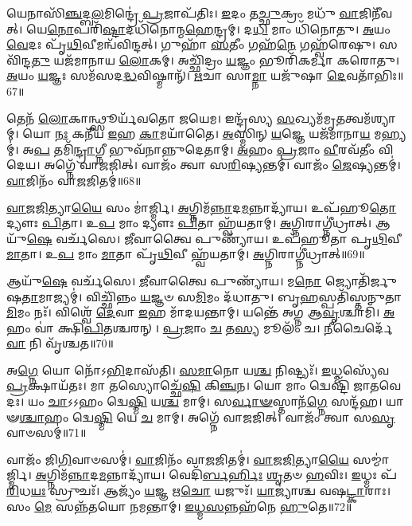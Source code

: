 𑌯𑍇𑌨𑌾𑌸𑌿᳴\-\ul{𑌞𑍍𑌚}\-𑌦𑍍𑌬\-\ul{𑌲}\-𑌮𑌿𑌨𑍍𑌦𑍍𑌰𑍇॑ \ul{𑌪𑍍𑌰}\-𑌜𑌾\-𑌪᳴𑌤𑌿𑌃।
\-\ul{𑌇}\-𑌦𑌂 𑌤\-\ul{𑌚𑍍𑌛𑍁}\-𑌕𑍍𑌰𑌂 𑌮𑌧𑍁᳴ \ul{𑌵𑌾}\-𑌜𑌿𑌨𑍀᳴𑌵𑌤𑍍।
𑌯𑍇\-\ul{𑌨𑍋}\-𑌪𑌰𑌿᳴\-\ul{𑌷𑍍𑌟𑌾}\-𑌦𑌧𑌿᳴𑌨𑍋𑌨𑍍𑌮\-\ul{𑌹𑍇}\-𑌨𑍍𑌦𑍍𑌰𑌮𑍍।
𑌦\-\ul{𑌧𑌿} 𑌮𑌾𑌂 𑌧𑌿᳴𑌨𑍋𑌤𑍁।
\-\ul{𑌅}\-𑌯𑌂 \ul{𑌵𑍇}\-𑌦𑌃 𑌪𑍃᳴\-\ul{𑌥𑌿}\-𑌵𑍀𑌮𑌨𑍍𑌵᳴𑌵𑌿𑌨𑍍𑌦𑌤𑍍।
𑌗𑍁𑌹𑌾᳴ \ul{𑌸}\-𑌤𑍀𑌂 𑌗𑌹᳴\-\ul{𑌨𑍇} 𑌗𑌹𑍍𑌵᳴𑌰𑍇𑌷𑍁।
𑌸 𑌵𑌿᳴𑌨𑍍𑌦\-\ul{𑌤𑍁} 𑌯𑌜᳴𑌮𑌾𑌨𑌾𑌯 \ul{𑌲𑍋}\-𑌕𑌮𑍍।
𑌅𑌚𑍍𑌛𑌿᳴𑌦𑍍𑌰𑌂 \ul{𑌯}\-𑌜𑍍𑌞𑌂 𑌭𑍂𑌰𑌿᳴𑌕𑌰𑍍𑌮𑌾 𑌕𑌰𑍋𑌤𑍁।
\-\ul{𑌅}\-𑌯𑌂 \ul{𑌯}\-𑌜𑍍𑌞𑌃 𑌸𑌮᳴𑌸𑌦\-\ul{𑌦𑍍𑌧}\-𑌵𑌿𑌷𑍍𑌮𑌾𑌨𑍍᳴।
\-\ul{𑌋}\-𑌚𑌾 𑌸𑌾\-\ul{𑌮𑍍𑌨𑌾} 𑌯𑌜𑍁᳴𑌷𑌾 \ul{𑌦𑍇}\-𑌵𑌤𑌾᳴𑌭𑌿𑌃॥67॥

𑌤𑍇𑌨᳴ \ul{𑌲𑍋}\-𑌕𑌾𑌨𑍍𑌥𑍍𑌸𑍂𑌰𑍍𑌯᳴𑌵𑌤𑍋 𑌜𑌯𑍇𑌮।
𑌇𑌨𑍍𑌦𑍍𑌰᳴𑌸𑍍𑌯 \ul{𑌸}\-𑌖𑍍𑌯𑌮᳴𑌮𑍃\-\ul{𑌤}\-𑌤𑍍𑌵𑌮᳴\-𑌶𑍍𑌯𑌾𑌮𑍍।
𑌯𑍋 \ul{𑌨𑌃} 𑌕𑌨𑍀᳴𑌯 \ul{𑌇}\-𑌹 \ul{𑌕𑌾}\-𑌮𑌯𑌾᳴𑌤𑍈।
\-\ul{𑌅}\-𑌸𑍍𑌮𑌿𑌨𑍍 \ul{𑌯}\-𑌜𑍍𑌞𑍇 𑌯𑌜᳴𑌮𑌾𑌨𑌾\-\ul{𑌯} 𑌮𑌹𑍍𑌯𑌮𑍍॑।
𑌅\-\ul{𑌪} 𑌤𑌮𑌿᳴\-\ul{𑌨𑍍𑌦𑍍𑌰𑌾}\-𑌗𑍍𑌨𑍀 𑌭𑍁𑌵᳴𑌨𑌾𑌨𑍍𑌨𑍁𑌦𑍇𑌤𑌾𑌮𑍍।
\-\ul{𑌅}\-𑌹𑌂 \ul{𑌪𑍍𑌰}\-𑌜𑌾𑌂 \ul{𑌵𑍀}\-𑌰𑌵᳴𑌤𑍀𑌂 𑌵𑌿𑌦𑍇𑌯।
𑌅𑌗𑍍𑌨𑍇᳴ 𑌵𑌾𑌜𑌜𑌿𑌤𑍍।
𑌵𑌾𑌜𑌂᳴ 𑌤𑍍𑌵𑌾 𑌸\-\ul{𑌰𑌿}\-𑌷𑍍𑌯𑌨𑍍𑌤𑌮𑍍॑।
𑌵𑌾𑌜𑌂᳴ \ul{𑌜𑍇}\-𑌷𑍍𑌯𑌨𑍍𑌤𑌮𑍍॑।
\-\ul{𑌵𑌾}\-𑌜𑌿𑌨𑌂᳴ 𑌵𑌾\-\ul{𑌜}\-𑌜𑌿𑌤𑌮𑍍॑॥68॥

\-\ul{𑌵𑌾}\-\-\ul{𑌜}\-\-\ul{𑌜𑌿}\-𑌤𑍍𑌯𑌾\-\ul{𑌯𑍈} 𑌸𑌂 𑌮𑌾॑𑌰𑍍𑌜𑍍𑌮𑌿।
\-\ul{𑌅}\-𑌗𑍍𑌨𑌿𑌮᳴\-\ul{𑌨𑍍𑌨𑌾}\-𑌦\-\ul{𑌮}\-𑌨𑍍𑌨𑌾𑌦𑍍𑌯𑌾᳴𑌯।
𑌉𑌪᳴𑌹𑍂\-\ul{𑌤𑍋} 𑌦𑍍𑌯𑍗𑌃 \ul{𑌪𑌿}\-𑌤𑌾।
𑌉\-\ul{𑌪} 𑌮𑌾𑌂 𑌦𑍍𑌯𑍗𑌃 \ul{𑌪𑌿}\-𑌤𑌾 𑌹𑍍𑌵᳴𑌯𑌤𑌾𑌮𑍍।
\-\ul{𑌅}\-𑌗𑍍𑌨𑌿𑌰𑌾𑌗𑍍𑌨𑍀॑𑌧𑍍𑌰𑌾𑌤𑍍।
𑌆𑌯𑍁᳴\-\ul{𑌷𑍇} 𑌵𑌰𑍍𑌚᳴𑌸𑍇।
\-\ul{𑌜𑍀}\-𑌵𑌾𑌤𑍍𑌵𑍈 𑌪𑍁𑌣𑍍𑌯𑌾᳴𑌯।
𑌉𑌪᳴𑌹𑍂𑌤𑌾 𑌪𑍃\-\ul{𑌥𑌿}\-𑌵𑍀 \ul{𑌮𑌾}\-𑌤𑌾।
𑌉\-\ul{𑌪} 𑌮𑌾𑌂 \ul{𑌮𑌾}\-𑌤𑌾 𑌪𑍃᳴\-\ul{𑌥𑌿}\-𑌵𑍀 𑌹𑍍𑌵᳴𑌯𑌤𑌾𑌮𑍍।
\-\ul{𑌅}\-𑌗𑍍𑌨𑌿𑌰𑌾𑌗𑍍𑌨𑍀॑𑌧𑍍𑌰𑌾𑌤𑍍॥69॥

𑌆𑌯𑍁᳴\-\ul{𑌷𑍇} 𑌵𑌰𑍍𑌚᳴𑌸𑍇।
\-\ul{𑌜𑍀}\-𑌵𑌾𑌤𑍍𑌵𑍈 𑌪𑍁𑌣𑍍𑌯𑌾᳴𑌯।
𑌮\-\ul{𑌨𑍋} 𑌜𑍍𑌯𑍋𑌤𑌿᳴𑌰𑍍𑌜𑍁𑌷\-\ul{𑌤𑌾}\-𑌮𑌾\-𑌜𑍍𑌯𑌮𑍍॑।
𑌵𑌿𑌚𑍍𑌛𑌿᳴𑌨𑍍𑌨𑌂 \ul{𑌯}\-𑌜𑍍𑌞𑍞 𑌸\-\ul{𑌮𑌿}\-𑌮𑌂 𑌦᳴𑌧𑌾𑌤𑍁।
𑌬𑍃\-\ul{𑌹}\-𑌸𑍍𑌪𑌤𑌿᳴𑌸𑍍𑌤𑌨𑍁𑌤𑌾\-\ul{𑌮𑌿}\-𑌮𑌂 𑌨𑌃᳴।
𑌵𑌿𑌶𑍍𑌵𑍇᳴ \ul{𑌦𑍇}\-𑌵𑌾 \ul{𑌇}\-𑌹 𑌮𑌾᳴𑌦𑌯𑌨𑍍𑌤𑌾𑌮𑍍।
𑌯𑌨𑍍𑌤𑍇᳴ 𑌅𑌗𑍍𑌨 𑌆\-\ul{𑌵𑍃}\-𑌶𑍍𑌚𑌾𑌮𑌿᳴।
\-\ul{𑌅}\-𑌹𑌂 𑌵𑌾॑ 𑌕𑍍𑌷𑌿\-\ul{𑌪𑌿}\-𑌤𑌶𑍍𑌚𑌰𑌨𑍍।
\-\ul{𑌪𑍍𑌰}\-𑌜𑌾𑌂 \ul{𑌚} 𑌤\-\ul{𑌸𑍍𑌯} 𑌮𑍂𑌲𑌂᳴ 𑌚।
\-\ul{𑌨𑍀}\-𑌚𑍈𑌰𑍍𑌦𑍇᳴\-\ul{𑌵𑌾} 𑌨𑌿 𑌵𑍃᳴𑌶𑍍𑌚𑌤॥70॥

𑌅\-\ul{𑌗𑍍𑌨𑍇} 𑌯𑍋 𑌨𑍋᳴\-𑌽\-\ul{𑌭𑌿}\-𑌦𑌾𑌸᳴𑌤𑌿।
\-\ul{𑌸}\-\-\ul{𑌮𑌾}\-𑌨𑍋 𑌯\-\ul{𑌶𑍍𑌚} 𑌨𑌿𑌷𑍍𑌟𑍍𑌯𑌃᳴।
\-\ul{𑌇}\-𑌧𑍍𑌮𑌸𑍍𑌯𑍇᳴𑌵 \ul{𑌪𑍍𑌰}\-𑌕𑍍𑌷𑌾𑌯᳴𑌤𑌃।
𑌮𑌾 𑌤𑌸𑍍𑌯𑍋𑌚𑍍𑌛𑍇᳴\-\ul{𑌷𑌿} 𑌕𑌿\-\ul{𑌞𑍍𑌚}\-𑌨।
𑌯𑍋 𑌮𑌾𑌂 𑌦𑍍𑌵𑍇𑌷𑍍𑌟𑌿᳴ 𑌜𑌾𑌤𑌵𑍇𑌦𑌃।
𑌯𑌂 \ul{𑌚𑌾}\-𑌽𑌽𑌹𑌂 𑌦𑍍𑌵𑍇\-\ul{𑌷𑍍𑌮𑌿} 𑌯\-\ul{𑌶𑍍𑌚} 𑌮𑌾𑌮𑍍।
𑌸\-\ul{𑌰𑍍𑌵𑌾}\-\-\ul{𑍟}\-𑌸𑍍𑌤𑌾𑌨᳴\-\ul{𑌗𑍍𑌨𑍇} 𑌸𑌨𑍍𑌦᳴𑌹।
𑌯𑌾𑍟\-\ul{𑌶𑍍𑌚𑌾}\-𑌹𑌂 𑌦𑍍𑌵𑍇\-\ul{𑌷𑍍𑌮𑌿} 𑌯𑍇 \ul{𑌚} 𑌮𑌾𑌮𑍍।
𑌅𑌗𑍍𑌨𑍇᳴ 𑌵𑌾𑌜𑌜𑌿𑌤𑍍।
𑌵𑌾𑌜𑌂᳴ 𑌤𑍍𑌵𑌾 𑌸\-\ul{𑌸𑍃}\-𑌵𑌾𑍞𑌸𑌮𑍍॑॥71॥

𑌵𑌾𑌜𑌂᳴ 𑌜𑌿\-\ul{𑌗𑌿}\-𑌵𑌾𑍞𑌸𑌮𑍍॑।
\-\ul{𑌵𑌾}\-𑌜𑌿𑌨𑌂᳴ 𑌵𑌾\-\ul{𑌜}\-𑌜𑌿𑌤𑌮𑍍॑।
\-\ul{𑌵𑌾}\-\-\ul{𑌜}\-\-\ul{𑌜𑌿}\-𑌤𑍍𑌯𑌾\-\ul{𑌯𑍈} 𑌸𑌮𑍍𑌮𑌾॑𑌰𑍍𑌜𑍍𑌮𑌿।
\-\ul{𑌅}\-𑌗𑍍𑌨𑌿𑌮᳴\-\ul{𑌨𑍍𑌨𑌾}\-𑌦\-\ul{𑌮}\-𑌨𑍍𑌨𑌾𑌦𑍍𑌯𑌾᳴𑌯।
𑌵𑍇𑌦𑌿᳴\-\ul{𑌰𑍍𑌬}\-\-\ul{𑌰𑍍}\-𑌹𑌿𑌃 \ul{𑌶𑍃}\-𑌤𑍞 \ul{𑌹}\-𑌵𑌿𑌃।
\-\ul{𑌇}\-𑌧𑍍𑌮𑌃 𑌪᳴\-\ul{𑌰𑌿}\-𑌧\-\ul{𑌯𑌃} 𑌸𑍍𑌰𑍁𑌚𑌃᳴।
𑌆𑌜𑍍𑌯𑌂᳴ \ul{𑌯}\-𑌜𑍍𑌞 𑌋\-\ul{𑌚𑍋} 𑌯𑌜𑍁𑌃᳴।
\-\ul{𑌯𑌾}\-𑌜𑍍𑌯𑌾॑𑌶𑍍𑌚 𑌵𑌷\-\ul{𑌟𑍍𑌕𑌾}\-𑌰𑌾𑌃।
𑌸𑌂 \ul{𑌮𑍇} 𑌸𑌨𑍍𑌨᳴𑌤𑌯𑍋 𑌨𑌮𑌨𑍍𑌤𑌾𑌮𑍍।
\-\ul{𑌇}\-\-\ul{𑌧𑍍𑌮}\-\-\ul{𑌸}\-𑌨𑍍𑌨𑌹᳴𑌨𑍇 \ul{𑌹𑍁}\-𑌤𑍇॥72॥

